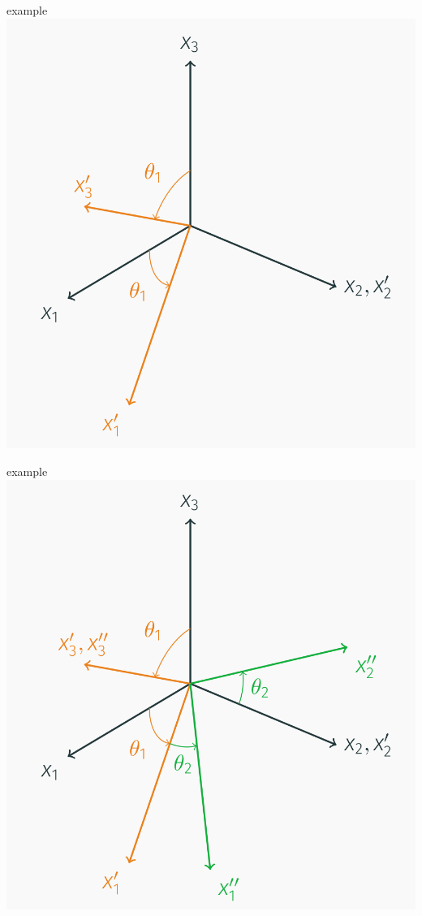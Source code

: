 \documentclass[
  letterpaper,
  ignorenonframetext,
  aspectratio=43,
  handout,
  12pt]{beamer}
\let\Oldincludegraphics\includegraphics
\renewcommand{\includegraphics}[2][]{\Oldincludegraphics[width=\textwidth,height=0.7\textheight,keepaspectratio]{#2}}
\begin{document}
\begin{frame}{example}
\protect\hypertarget{example-6}{}
\includegraphics{../images/example-b.png}
\end{frame}

\begin{frame}{example}
\protect\hypertarget{example-7}{}
\includegraphics{../images/example-c.png}
\end{frame}
\end{document}
